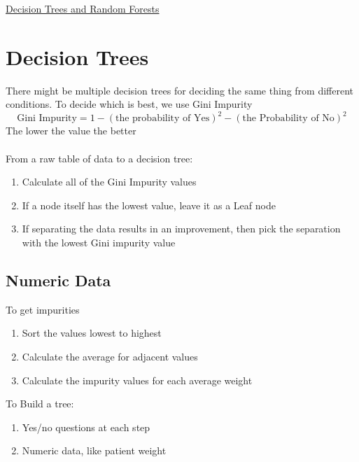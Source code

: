 \documentclass{article}[18pt]
\begin{document}
\begin{center}
\underline{\huge Decision Trees and Random Forests}
\end{center}
\section{Decision Trees}
There might be multiple decision trees for deciding the same thing from different conditions. To decide which is best, we use Gini Impurity
$$\text{Gini Impurity}=1-(\text{the probability of Yes})^2-(\text{the Probability of No})^2$$
The lower the value the better\\
\\
From a raw table of data to a decision tree:
\begin{enumerate}
	\item Calculate all of the Gini Impurity values
	\item If a node itself has the lowest value, leave it as a Leaf node
	\item If separating the data results in an improvement, then pick the separation with the lowest Gini impurity value
\end{enumerate}
\subsection{Numeric Data}
To get impurities
\begin{enumerate}
	\item Sort the values lowest to highest
	\item Calculate the average for adjacent values
	\item Calculate the impurity values for each average weight
\end{enumerate}
To Build a tree:
\begin{enumerate}
	\item Yes/no questions at each step
	\item Numeric data, like patient weight
\end{enumerate}
\end{document}
